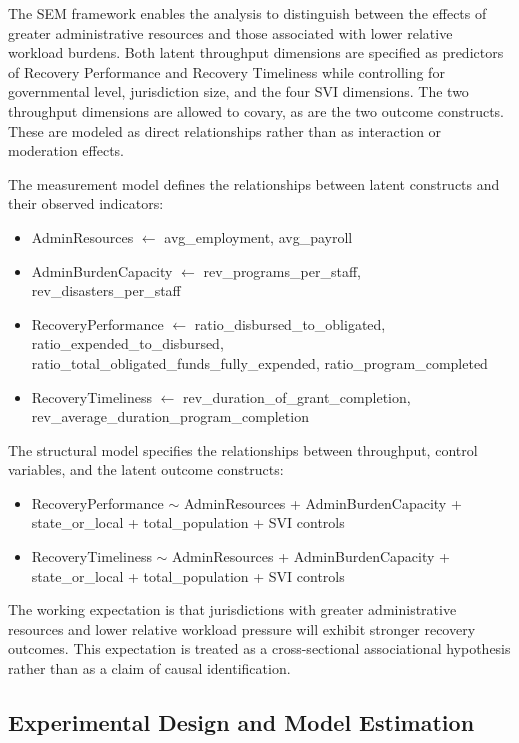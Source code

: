 \documentclass[
  number]{elsarticle}
\providecommand{\tightlist}{%
  \setlength{\itemsep}{0pt}\setlength{\parskip}{0pt}}
\begin{document}
The SEM framework enables the analysis to distinguish between the
effects of greater administrative resources and those associated with
lower relative workload burdens. Both latent throughput dimensions are
specified as predictors of Recovery Performance and Recovery Timeliness
while controlling for governmental level, jurisdiction size, and the
four SVI dimensions. The two throughput dimensions are allowed to
covary, as are the two outcome constructs. These are modeled as direct
relationships rather than as interaction or moderation effects.

The measurement model defines the relationships between latent
constructs and their observed indicators:

\begin{itemize}
\tightlist
\item
  AdminResources \(\leftarrow\) avg\_employment, avg\_payroll
\item
  AdminBurdenCapacity \(\leftarrow\) rev\_programs\_per\_staff,
  rev\_disasters\_per\_staff
\item
  RecoveryPerformance \(\leftarrow\) ratio\_disbursed\_to\_obligated,
  ratio\_expended\_to\_disbursed,
  ratio\_total\_obligated\_funds\_fully\_expended,
  ratio\_program\_completed
\item
  RecoveryTimeliness \(\leftarrow\)
  rev\_duration\_of\_grant\_completion,
  rev\_average\_duration\_program\_completion
\end{itemize}

The structural model specifies the relationships between throughput,
control variables, and the latent outcome constructs:

\begin{itemize}
\tightlist
\item
  RecoveryPerformance \(\sim\) AdminResources + AdminBurdenCapacity +
  state\_or\_local + total\_population + SVI controls
\item
  RecoveryTimeliness \(\sim\) AdminResources + AdminBurdenCapacity +
  state\_or\_local + total\_population + SVI controls
\end{itemize}

The working expectation is that jurisdictions with greater
administrative resources and lower relative workload pressure will
exhibit stronger recovery outcomes. This expectation is treated as a
cross-sectional associational hypothesis rather than as a claim of
causal identification.

\subsection{Experimental Design and Model
Estimation}\label{experimental-design-and-model-estimation}
\end{document}
